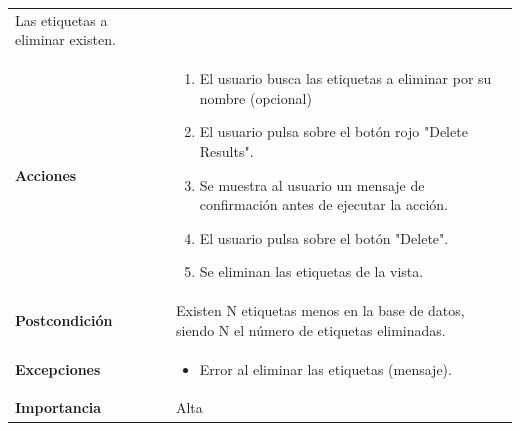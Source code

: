 \documentclass[
]{article}
\providecommand{\tightlist}{%
  \setlength{\itemsep}{0pt}\setlength{\parskip}{0pt}}
\begin{document}
\begin{longtable}[]{@{}ll@{}}
\begin{minipage}[t]{0.74\columnwidth}
Las etiquetas a eliminar existen.\strut
\end{minipage}\tabularnewline
\begin{minipage}[t]{0.21\columnwidth}\raggedright
\textbf{Acciones}\strut
\end{minipage} & \begin{minipage}[t]{0.74\columnwidth}\raggedright
\begin{enumerate}
\def\labelenumi{\arabic{enumi}.}
\tightlist
\item
  El usuario busca las etiquetas a eliminar por su nombre (opcional)
\item
  El usuario pulsa sobre el botón rojo "Delete Results".
\item
  Se muestra al usuario un mensaje de confirmación antes de ejecutar la
  acción.
\item
  El usuario pulsa sobre el botón "Delete".
\item
  Se eliminan las etiquetas de la vista.
\end{enumerate}\strut
\end{minipage}\tabularnewline
\begin{minipage}[t]{0.21\columnwidth}\raggedright
\textbf{Postcondición}\strut
\end{minipage} & \begin{minipage}[t]{0.74\columnwidth}\raggedright
Existen N etiquetas menos en la base de datos, siendo N el número de
etiquetas eliminadas.\strut
\end{minipage}\tabularnewline
\begin{minipage}[t]{0.21\columnwidth}\raggedright
\textbf{Excepciones}\strut
\end{minipage} & \begin{minipage}[t]{0.74\columnwidth}\raggedright
\begin{itemize}
\tightlist
\item
  Error al eliminar las etiquetas (mensaje).
\end{itemize}\strut
\end{minipage}\tabularnewline
\begin{minipage}[t]{0.21\columnwidth}\raggedright
\textbf{Importancia}\strut
\end{minipage} & \begin{minipage}[t]{0.74\columnwidth}\raggedright
Alta\strut
\end{minipage}\tabularnewline
\bottomrule
\end{longtable}
\end{document}
